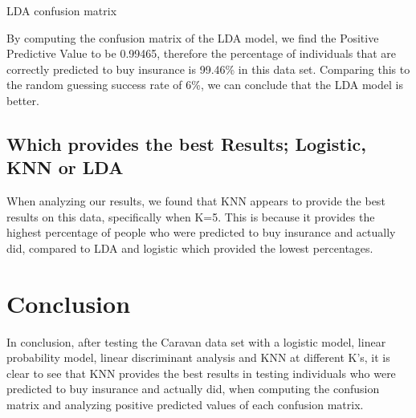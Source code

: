 \documentclass{article}
\begin{document}
\begin{table}[!htb]
\caption{LDA confusion matrix}
\label{model1}
\begin{center}


\end{center}
\end{table}


By computing the confusion matrix of the LDA model, we find the Positive Predictive Value to be 0.99465, therefore the percentage of individuals that are correctly predicted to buy insurance is 99.46\% in this data set. Comparing this to the random guessing success rate of 6\%, we can conclude that the LDA model is better.

\subsection{Which provides the best Results; Logistic, KNN or LDA}

When analyzing our results, we found that KNN appears to provide the best results on this data, specifically when K=5. This is because it provides the highest percentage of people who were predicted to buy insurance and actually did, compared to LDA and logistic which provided the lowest percentages. 

\section{Conclusion}
In conclusion, after testing the Caravan data set with a logistic model, linear probability model, linear discriminant analysis and KNN at different K's, it is clear to see that KNN provides the best results in testing individuals who were predicted to buy insurance and actually did, when computing the confusion matrix and analyzing positive predicted values of each confusion matrix.
\end{document}
